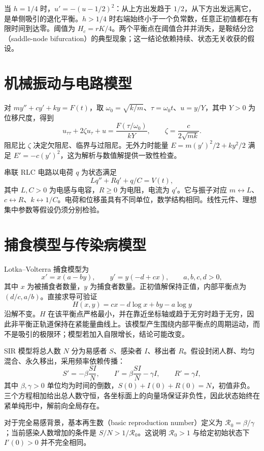 \documentclass[UTF8,12pt,a4paper,fontset=fandol]{ctexbook}
\begin{document}
当 $h=1/4$ 时，$u'=-(u-1/2)^2$：从上方出发趋于 $1/2$，从下方出发远离它，是单侧吸引的退化平衡。$h>1/4$ 时右端始终小于一个负常数，任意正初值都在有限时间到达零。阈值为 $H_c=rK/4$。两个平衡点在阈值合并并消失，是鞍结分岔（saddle-node bifurcation）的典型现象；这一结论依赖持续、状态无关收获的假设。

\section{机械振动与电路模型}
对 $my''+cy'+ky=F(t)$，取 $\omega_0=\sqrt{k/m}$、$\tau=\omega_0t$、$u=y/Y$，其中 $Y>0$ 为位移尺度，得到
\[
 u_{\tau\tau}+2\zeta u_\tau+u=\frac{F(\tau/\omega_0)}{kY},\qquad
 \zeta=\frac{c}{2\sqrt{mk}}.
\]
阻尼比 $\zeta$ 决定欠阻尼、临界与过阻尼。无外力时能量 $E=m(y')^2/2+ky^2/2$ 满足 $E'=-c(y')^2$，这为解析与数值解提供一致性检查。

串联 RLC 电路以电荷 $q$ 为状态满足
\[
 Lq''+Rq'+q/C=V(t),
\]
其中 $L,C>0$ 为电感与电容，$R\geq0$ 为电阻，电流为 $q'$。它与振子对应 $m\leftrightarrow L$、$c\leftrightarrow R$、$k\leftrightarrow1/C$。电荷和位移虽具有不同单位，数学结构相同。线性元件、理想集中参数等假设仍须分别检验。

\section{捕食模型与传染病模型}
Lotka--Volterra 捕食模型为
\[
 x'=x(a-by),\qquad y'=y(-d+cx),\qquad a,b,c,d>0,
\]
其中 $x$ 为被捕食者数量，$y$ 为捕食者数量。正初值解保持正值，内部平衡点为 $(d/c,a/b)$。直接求导可验证
\[
 H(x,y)=cx-d\log x+by-a\log y
\]
沿解不变。$H$ 在该平衡点严格最小，并在靠近坐标轴或趋于无穷时趋于无穷，因此非平衡正轨道保持在紧能量曲线上。该模型产生围绕内部平衡点的周期运动，而不是吸引的极限环；模型若加入自限增长，结论可能改变。

SIR 模型将总人数 $N$ 分为易感者 $S$、感染者 $I$、移出者 $R$。假设封闭人群、均匀混合、永久移出，采用频率依赖传播：
\begin{equation}
 S'=-\beta\frac{SI}{N},\qquad
 I'=\beta\frac{SI}{N}-\gamma I,\qquad
 R'=\gamma I,
 \label{eq:ode-sir}
\end{equation}
其中 $\beta,\gamma>0$ 单位均为时间的倒数，$S(0)+I(0)+R(0)=N$，初值非负。三个方程相加给出总人数守恒，各坐标面上的向量场保证非负性，因此状态始终在紧单纯形中，解前向全局存在。

对于完全易感背景，基本再生数（basic reproduction number）定义为 $\mathcal R_0=\beta/\gamma$；当前感染人数增加的条件是 $S/N>1/\mathcal R_0$。这说明 $\mathcal R_0>1$ 与给定初始状态下 $I'(0)>0$ 并不完全相同。
\end{document}
